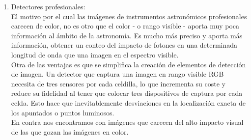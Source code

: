 \begin{enumerate}
\begin{figure}
				\caption{\label{fig:Chandra_Composed_Images}{\small Composición de imagen en color usando trés imágenes de intensidades, cada imagen se asocia a un canal del espectro RGB}}
			\end{figure}
		\item Detectores profesionales:\\
		El motivo por el cual las imágenes de instrumentos astronómicos profesionales carecen de color, no es otro que el color - o rango visible - aporta muy poca información al ámbito de la astronomía. Es mucho más preciso y aporta más información, obtener un conteo del impacto de fotones en una determinada longitud de onda que una imagen en el espectro visible.
		\\
		Otra de las ventajas es que se simplifica la creación de elementos de detección de imagen. Un detector que captura una imagen en rango visible RGB necesita de tres sensores por cada celdilla, lo que incrementa su coste y reduce su fidelidad al tener que colocar tres dispositivos de captura por cada celda. Esto hace que  inevitablemente desviaciones en la localización exacta de los apuntados o puntos luminosos.
		\\
		En contra nos encontramos con imágenes que carecen del alto impacto visual de las que gozan las imágenes en color.
	\end{enumerate}
	

